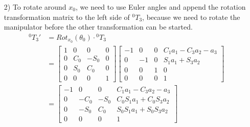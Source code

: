 \documentclass[a4paper,11pt]{article}
\begin{document}
\begin {enumerate}
\begin{enumerate}
\begin{align*}
    	&= \begin{bmatrix} C_{1+2+3} & -S_{1+2+3} & 0 & C_{1+2+3}a_3 + C_{1+2}a_2+C_1a_1\\ S_{1+2+3} & C_{1+2+3} & 0 & S_{1+2+3}a_3 + S_{1+2}a_2 + S_1a_1\\ 0 & 0 & 1 & 0\\ 0 & 0 & 0 & 1 \end{bmatrix}
    \end{align*}
	
	Because the relation $\theta_1 + \theta_2 + \theta_3 = 180\degree$ is given, we can simplify the results. For $\cos(180\degree) = -1$ and $\sin(180\degree) = 0$:
		$${^0T_3} = \begin{bmatrix}
			-1 & 0 & 0 & -a_3 + C_{1+2}a_2+C_1a_1\\
			0 & -1 & 0 & S_{1+2}a_2 + S_1a_1\\
			0 & 0 & 1 & 0\\
			0 & 0 & 0 & 1
		\end{bmatrix}$$
	Furthermore, $\cos(\alpha) = -\cos(180\degree - \alpha)$ and $\sin(\alpha) = \sin(180\degree - \alpha)$ for $\alpha \in [0\degree, 180\degree]$. These facts result in the given transformation matrix:
		$${^0T_3} = \begin{bmatrix}
			-1 & 0 & 0 & C_1a_1 - C_{3}a_2 - a_3\\
			0 & -1 & 0 & S_1a_1 + S_{3}a_2\\
			0 & 0 & 1 & 0\\
			0 & 0 & 0 & 1
		\end{bmatrix}$$
        \item[2)] To rotate around $x_0$, we need to use Euler angles and append the rotation transformation matrix to the left side of ${^0T_3}$, because we need to rotate the manipulator before the other transformation can be started.
        \begin{align*}
        	{^0T_3}' &= Rot_{x_0}(\theta_0) \cdot {^0T_3}\\
        	&= \begin{bmatrix}
			1 & 0 & 0 & 0\\
			0 & C_0 & -S_0 & 0\\
			0 & S_0 & C_0 & 0\\
			0 & 0 & 0 & 1
		\end{bmatrix} \begin{bmatrix}
			-1 & 0 & 0 & C_1a_1 - C_{3}a_2 - a_3\\
			0 & -1 & 0 & S_1a_1 + S_{3}a_2\\
			0 & 0 & 1 & 0\\
			0 & 0 & 0 & 1
		\end{bmatrix}\\
			&= \begin{bmatrix}
			-1 & 0 & 0 & C_1a_1 - C_{3}a_2 - a_3\\
			0 & -C_0 & -S_0 & C_0S_1a_1 + C_0S_{3}a_2\\
			0 & -S_0 & C_0 & S_0S_1a_1 + S_0S_3a_2\\
			0 & 0 & 0 & 1
		\end{bmatrix}
        \end{align*}
        

\end{enumerate}
\end{enumerate}
\end{document}
